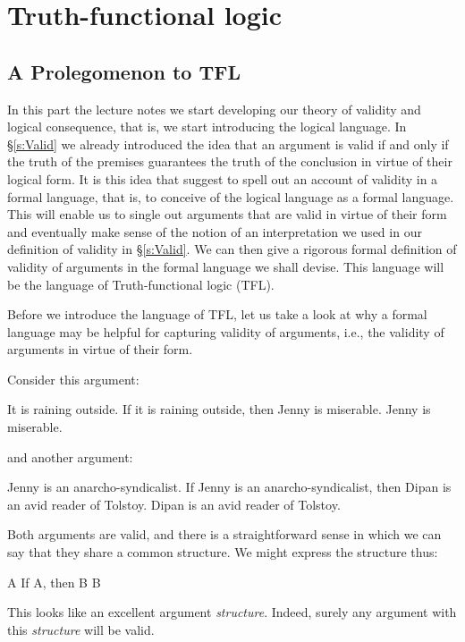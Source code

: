 \part{Truth-functional logic}
\label{ch.TFL}

\chapter{A Prolegomenon to TFL}
In this part the lecture notes we start developing our theory of validity and logical consequence, that is, we start introducing the logical language. In \S\ref{s:Valid} we already introduced the idea that an argument is valid if and only if the truth of the premises guarantees the truth of the conclusion in virtue of their logical form. It is this idea that suggest to spell out an account of validity in a formal language, that is, to conceive of the logical language as a formal language. This will enable us to single out arguments that are valid in virtue of their form and eventually make sense of the notion of an interpretation we used in our definition of validity in \S\ref{s:Valid}. We can then give a rigorous formal definition of validity of arguments in the formal language we shall devise. This language will be the language of Truth-functional logic (TFL).

Before we introduce the language of TFL, let us take a look at why a formal language may be helpful for capturing validity of arguments, i.e., the validity of arguments in virtue of their form.

Consider this argument:
	\begin{earg}
		\prem It is raining outside.
		\prem If it is raining outside, then Jenny is miserable.
		\conc Jenny is miserable.
	\end{earg}
and another argument:
	\begin{earg}
		\prem Jenny is an anarcho-syndicalist.
		\prem If Jenny is an anarcho-syndicalist, then Dipan is an avid reader of Tolstoy.
		\conc Dipan is an avid reader of Tolstoy.
	\end{earg}
Both arguments are valid, and there is a straightforward sense in which we can say that they share a common structure. We might express the structure thus:
	\begin{earg}
		\prem A
		\prem If A, then B
		\conc B
	\end{earg}
This looks like an excellent argument \emph{structure}. Indeed, surely any argument with this \emph{structure} will be valid.

